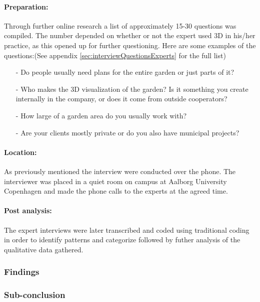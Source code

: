 		\paragraph*{Preparation:}
		Through further online research a list of approximately 15-30 questions was compiled. The number depended on whether or not the expert used 3D in his/her practice, as this opened up for further questioning. Here are some examples of the questions:(See appendix \ref{sec:interviewQuestionsExperts} for the full list)

		\begin{itemize}
			\item[-] Do people usually need plans for the entire garden or just parts of it?
			\item[-] Who makes the 3D visualization of the garden? Is it something you create internally in the company, or does it come from outside cooperators? 
			\item[-] How large of a garden area do you usually work with?
			\item[-] Are your clients mostly private or do you also have municipal projects?
		\end{itemize}
		
		\paragraph*{Location:}As previously mentioned the interview were conducted over the phone. The interviewer was placed in a quiet room on campus at Aalborg University Copenhagen and made the phone calls to the experts at the agreed time.

		\paragraph*{Post analysis:}The expert interviews were later transcribed  and coded using traditional coding in order to identify patterns and categorize followed by futher analysis of the qualitative data gathered.
		
		\subsubsection{Findings}		
		
		\subsubsection{Sub-conclusion}

